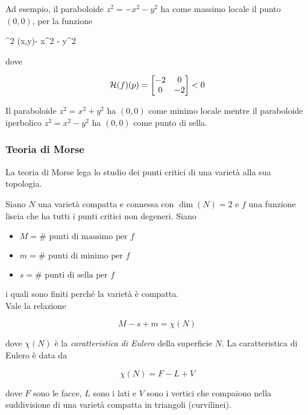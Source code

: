 Ad esempio, il paraboloide $ z^{2} = - x^{2} - y^{2} $ ha come massimo locale il punto $ (0,0) $, per la funzione

	{\R^{2}}{\R}
	{(x,y)}{- x^{2} - y^{2}}

dove

\begin{equation}
	\mathcal{H}(f)(p) = \bmqty{ -2 & 0 \\ 0 & -2 } < 0
\end{equation}

Il paraboloide $ z^{2} = x^{2} + y^{2} $ ha $ (0,0) $ come minimo locale mentre il paraboloide iperbolico $ z^{2} = x^{2} - y^{2} $ ha $ (0,0) $ come punto di sella.

\subsubsection{Teoria di Morse}

La teoria di Morse lega lo studio dei punti critici di una varietà alla sua topologia.

\begin{theorem}
	Siano $ N $ una varietà compatta e connessa con $ \dim(N)=2 $ e $ f $ una funzione liscia che ha tutti i punti critici non degeneri. Siano
	
	\begin{itemize}
		\item $ M = \# \text{ punti di massimo per } f $
		
		\item $ m = \# \text{ punti di minimo per } f $
		
		\item $ s = \# \text{ punti di sella per } f $
	\end{itemize}

	i quali sono finiti perché la varietà è compatta.\\
	Vale la relazione
	
	\begin{equation}
		M - s + m = \chi(N)
	\end{equation}

	dove $ \chi(N) $ è la \textit{caratteristica di Eulero} della superficie $ N $. La caratteristica di Eulero è data da
	
	\begin{equation}
		\chi(N) = F - L + V
	\end{equation}

	dove $ F $ sono le facce, $ L $ sono i lati e $ V $ sono i vertici che compaiono nella suddivisione di una varietà compatta in triangoli (curvilinei).
\end{theorem}


